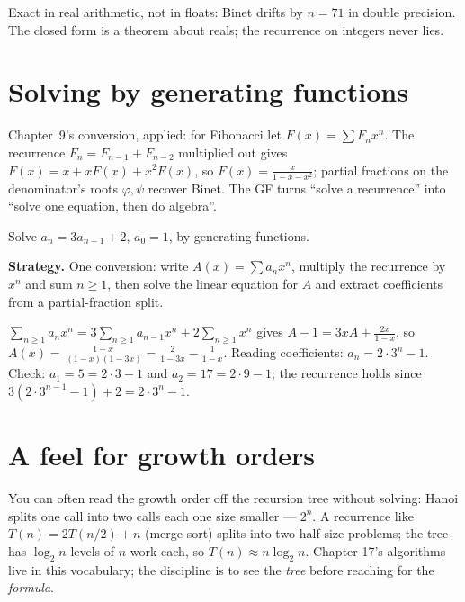Exact in real arithmetic, not in floats: Binet drifts by $n = 71$ in
double precision. The closed form is a theorem about reals; the
recurrence on integers never lies.

\section{Solving by generating functions}\label{sec:recgf}
Chapter~9's conversion, applied: for Fibonacci let
$F(x) = \sum F_n x^n$. The recurrence $F_n = F_{n-1} + F_{n-2}$
multiplied out gives $F(x) = x + xF(x) + x^2F(x)$, so
$F(x) = \frac{x}{1 - x - x^2}$; partial fractions on the denominator's
roots $\varphi, \psi$ recover Binet. The GF turns ``solve a
recurrence'' into ``solve one equation, then do algebra''.

\begin{example}\label{ex:gf3n}
Solve $a_n = 3a_{n-1} + 2$, $a_0 = 1$, by generating functions.
\par\smallskip
\textbf{Strategy.} One conversion: write $A(x) = \sum a_n x^n$, multiply
the recurrence by $x^n$ and sum $n \ge 1$, then solve the linear
equation for $A$ and extract coefficients from a partial-fraction split.
\par\smallskip
\begin{solution}
$\sum_{n\ge1} a_n x^n = 3\sum_{n\ge1} a_{n-1} x^n + 2\sum_{n\ge1} x^n$
gives $A - 1 = 3xA + \frac{2x}{1-x}$, so
$A(x) = \frac{1+x}{\,(1-x)(1-3x)} = \frac{2}{1-3x} - \frac{1}{1-x}$.
Reading coefficients: $a_n = 2\cdot 3^n - 1$. Check: $a_1 = 5 = 2\cdot3-1$
and $a_2 = 17 = 2\cdot9-1$; the recurrence holds since
$3(2\cdot3^{n-1}-1)+2 = 2\cdot 3^n - 1$.
\end{solution}
\end{example}

\section{A feel for growth orders}\label{sec:growth}
You can often read the growth order off the recursion tree without
solving: Hanoi splits one call into two calls each one size smaller ---
$2^n$. A recurrence like $T(n) = 2T(n/2) + n$ (merge sort) splits into
two half-size problems; the tree has $\log_2 n$ levels of $n$ work
each, so $T(n) \approx n \log_2 n$. Chapter-17's algorithms live in
this vocabulary; the discipline is to see the \emph{tree} before
reaching for the \emph{formula}.

